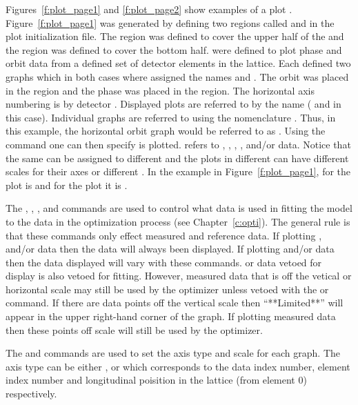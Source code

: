 Figures~\ref{f:plot_page1} and \ref{f:plot_page2} show examples of a
plot . Figure~\ref{f:plot_page1} was generated by defining
two regions called  and  in the plot initialization
file. The  region was defined to cover the upper half of the
 and the  region was defined to cover the bottom
half.  were defined to plot phase and orbit data
from a defined set of detector elements in the lattice. Each
 defined two graphs which in both cases where
assigned the names  and . The orbit  was
placed in the  region and the phase  was
placed in the  region. The horizontal axis numbering is by
detector .  Displayed plots are referred to by the
 name ( and  in this case). Individual
graphs are referred to using the nomenclature
. Thus, in this example, the horizontal orbit graph
would be referred to as .  Using the  command one
can then specify  is plotted.  refers to
, , , , and/or
 data.  Notice that the same  can be
assigned to different  and the plots in different
 can have different scales for their axes or different
. In the example in Figure~\ref{f:plot_page1},  for the
 plot is  and for the  plot it is
.

The , , , and  commands are used to
control what data is used in fitting the model to the data in the optimization
process (see Chapter~\ref{c:opti}). The general rule is that these commands only
effect measured and reference data. If plotting ,  and/or
 data then the data will always been displayed. If plotting 
and/or  data then the data displayed will vary with these commands.
 or  data vetoed for display is also vetoed for fitting.
However, measured data that is off the vetical or horizontal scale may still be
used by the optimizer unless vetoed with the  or  command.  If
there are data points off the vertical scale  then ``**Limited**'' will appear
in the upper right-hand corner of the graph. If plotting measured data then
these points off scale will still be used by the optimizer.

The  and  commands are used to set the axis type and
scale for each graph. The axis type can be either ,  or
 which corresponds to the data index number, element index number and
longitudinal poisition in the lattice (from element 0) respectively.


